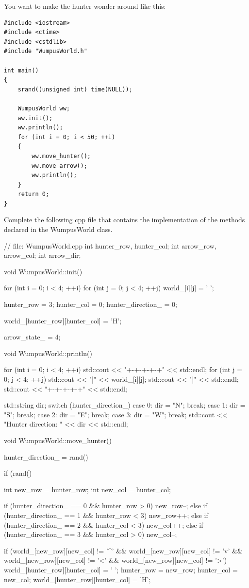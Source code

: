 You want to make the hunter wonder around like this:
\begin{Verbatim}[frame=single,fontsize=\footnotesize]
#include <iostream>
#include <ctime>
#include <cstdlib>
#include "WumpusWorld.h"

int main()
{
    srand((unsigned int) time(NULL));

    WumpusWorld ww;
    ww.init();
    ww.println();
    for (int i = 0; i < 50; ++i)
    {
        ww.move_hunter();
        ww.move_arrow();
        ww.println();
    }
    return 0;
}
\end{Verbatim}
Complete the following cpp file that contains the implementation
of the methods declared in the WumpusWorld class.
\\
\ANSWER
\begin{answercode}
// file: WumpusWorld.cpp
int hunter_row, hunter_col;
int arrow_row, arrow_col;
int arrow_dir;

void WumpusWorld::init()
{
  for (int i = 0; i < 4; ++i)
  {
    for (int j = 0; j < 4; ++j)
    {
      world_[i][j] = ' ';
    }
  }

  hunter_row = 3;
  hunter_col = 0;
  hunter_direction_ = 0;

  world_[hunter_row][hunter_col] = 'H';

  arrow_state_ = 4;
}

void WumpusWorld::println()
{
  for (int i = 0; i < 4; ++i)
  {
    std::cout << "+-+-+-+-+" << std::endl;
    for (int j = 0; j < 4; ++j)
    {
      std::cout << "|" << world_[i][j];
    }
    std::cout << "|" << std::endl;
  }
  std::cout << "+-+-+-+-+" << std::endl;

  std::string dir;
  switch (hunter_direction_)
  {
    case 0: dir = "N"; break;
    case 1: dir = "S"; break;
    case 2: dir = "E"; break;
    case 3: dir = "W"; break;
  }
  std::cout << "Hunter direction: " << dir << std::endl;
}

void WumpusWorld::move_hunter()
{
  hunter_direction_ = rand() %

  if (rand() %
  {
    int new_row = hunter_row;
    int new_col = hunter_col;

    if (hunter_direction_ == 0 && hunter_row > 0) new_row--;
    else if (hunter_direction_ == 1 && hunter_row < 3) new_row++;
    else if (hunter_direction_ == 2 && hunter_col < 3) new_col++;
    else if (hunter_direction_ == 3 && hunter_col > 0) new_col--;

    if (world_[new_row][new_col] != '^' &&
    world_[new_row][new_col] != 'v' &&
    world_[new_row][new_col] != '<' &&
    world_[new_row][new_col] != '>')
    {
      world_[hunter_row][hunter_col] = ' ';
      hunter_row = new_row;
      hunter_col = new_col;
      world_[hunter_row][hunter_col] = 'H';
    }
  }

}
\end{answercode}
